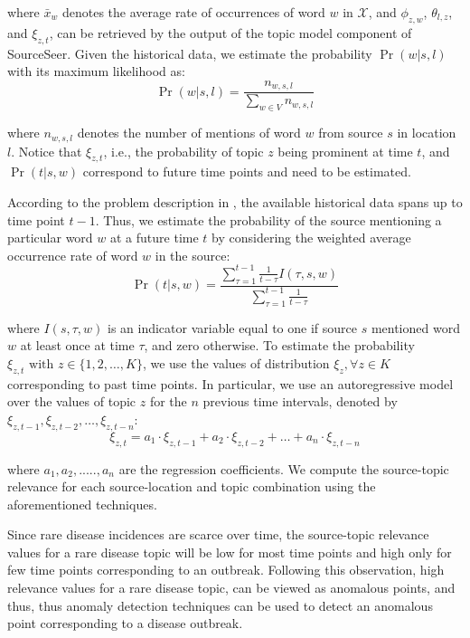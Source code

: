 \documentclass[twoside,leqno,twocolumn]{article}
\newcommand{\fullmodel}{{{\sf SourceSeer}}\xspace}
\begin{document}
\noindent where $\bar{x}_{w}$ denotes the average rate of occurrences of word $w$ in $\mathcal{X}$,  and 
$\phi_{z,w}$, $\theta_{l,z}$, and $\xi_{z,t}$, can be retrieved by the output of the topic model component of \fullmodel.  Given the historical data, we estimate the probability $\Pr(w|s,l)$ with its maximum likelihood as:
{\small \begin{equation}
  \Pr(w|s,l) = \frac{n_{w,s,l}}{\sum_{w\in V}n_{w,s,l}}
\end{equation}}
\vspace{-10pt}

\noindent where $n_{w,s,l}$ denotes the number of mentions of word $w$ from source $s$ in location $l$.
Notice that $\xi_{z,t}$, i.e., the probability of topic $z$ being prominent at time $t$, 
and $\Pr(t|s,w)$ correspond to future time points and need to be estimated.  

According to the problem description in , the available historical 
data spans up to time point $t-1$. Thus, we estimate the probability of the source 
mentioning a particular word $w$ at a future time $t$ by considering the weighted average occurrence rate of word $w$ in the source:
{\small \begin{equation}
\Pr(t|s,w) = \frac{\sum_{\tau = 1}^{t-1} \frac{1}{t - \tau}I(\tau,s,w)}{\sum_{\tau = 1}^{t-1} \frac{1}{t - \tau}}
\label{eq:prob_time}
\end{equation}}
\vspace{-10pt}

\noindent where $I(s,\tau,w)$ is an indicator variable equal to one if source $s$ mentioned word $w$ at least once at time $\tau$, and zero otherwise. 
To estimate the probability $\xi_{z,t} \mbox{ with } z \in \{1, 2, \dots, K\}$, 
we use the values of distribution $\xi_{z}, \forall z \in K$ corresponding to past time points. In particular, we use an autoregressive model over the values of topic $z$ for the $n$ previous time intervals, denoted by $\xi_{z,t-1},\xi_{z,t-2},\dots,\xi_{z,t-n}$:
{\small \begin{equation}
\xi_{z,t}=a_1 \cdot \xi_{z,t-1}+a_2\cdot \xi_{z,t-2}+\dots +a_n\cdot \xi_{z,t-n}
\end{equation}}
\vspace{-10pt}

\noindent where $a_1,a_2,.....,a_n$ are the regression coefficients. We compute the source-topic relevance for each source-location and topic combination using the aforementioned techniques.

Since rare disease incidences are scarce over time, the source-topic
relevance values for a rare disease topic will be low for most time
points and high only for few time points corresponding to an outbreak.
Following this observation, high relevance values for a rare disease
topic, can be viewed as anomalous points, and thus, thus anomaly detection techniques can be used to detect an anomalous point corresponding to a disease outbreak.
\end{document}
